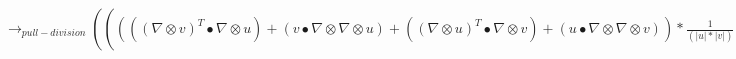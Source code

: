 \documentclass{article}
\begin{document}
\newline $\rightarrow_{pull-division}((((( \nabla  \otimes v)^T \bullet  \nabla  \otimes u)+(v \bullet  \nabla  \otimes  \nabla  \otimes u)+(( \nabla  \otimes u)^T \bullet  \nabla  \otimes v)+(u \bullet  \nabla  \otimes  \nabla  \otimes v))*\frac{1}{(|u|*|v|)}+(((u \bullet v)*((v \bullet  \nabla  \otimes v) \otimes (v \bullet  \nabla  \otimes v)))+(2*(u \bullet v)*((v \bullet  \nabla  \otimes v) \otimes (v \bullet  \nabla  \otimes v))))*\frac{1}{(|u|*|v|*((v \bullet v))^2)}+((u \bullet v)*((v \bullet  \nabla  \otimes v) \otimes (u \bullet  \nabla  \otimes u)))*\frac{1}{((u \bullet u)*|v|*|u|*(v \bullet v))}+((u \bullet v)*((u \bullet  \nabla  \otimes u) \otimes (v \bullet  \nabla  \otimes v)))*\frac{1}{(|u|*|v|*(u \bullet u)*(v \bullet v))}+((u \bullet v)*((u \bullet  \nabla  \otimes u) \otimes (u \bullet  \nabla  \otimes u)))*\frac{1}{(|u|*|v|*((u \bullet u))^2)}+(2*|u|*(u \bullet v)*((u \bullet  \nabla  \otimes u) \otimes (u \bullet  \nabla  \otimes u)))*\frac{1}{(|v|*(u \bullet u)*((u \bullet u))^2)})-(((((v \bullet  \nabla  \otimes u) \otimes (v \bullet  \nabla  \otimes v)))+(((u \bullet  \nabla  \otimes v) \otimes (v \bullet  \nabla  \otimes v))))*\frac{1}{(|u|*|v|*(v \bullet v))}+(((u \bullet  \nabla  \otimes v) \otimes (u \bullet  \nabla  \otimes u)))*\frac{1}{(|v|*|u|*(u \bullet u))}+((((v \bullet  \nabla  \otimes v) \otimes (u \bullet  \nabla  \otimes v)))+((u \bullet v)*(v \bullet  \nabla  \otimes  \nabla  \otimes v))+((u \bullet v)*(( \nabla  \otimes v)^T \bullet  \nabla  \otimes v))+(((v \bullet  \nabla  \otimes v) \otimes (v \bullet  \nabla  \otimes u))))*\frac{1}{(|v|*|u|*(v \bullet v))}+((((v \bullet  \nabla  \otimes u) \otimes (u \bullet  \nabla  \otimes u)))+(((u \bullet  \nabla  \otimes u) \otimes (v \bullet  \nabla  \otimes u)))+(((u \bullet  \nabla  \otimes u) \otimes (u \bullet  \nabla  \otimes v))))*\frac{1}{(|u|*|v|*(u \bullet u))}+((|u|*(u \bullet v)*(u \bullet  \nabla  \otimes  \nabla  \otimes u))+(|u|*(u \bullet v)*(( \nabla  \otimes u)^T \bullet  \nabla  \otimes u)))*\frac{1}{(|v|*(u \bullet u)*(u \bullet u))}))$
\end{document}
